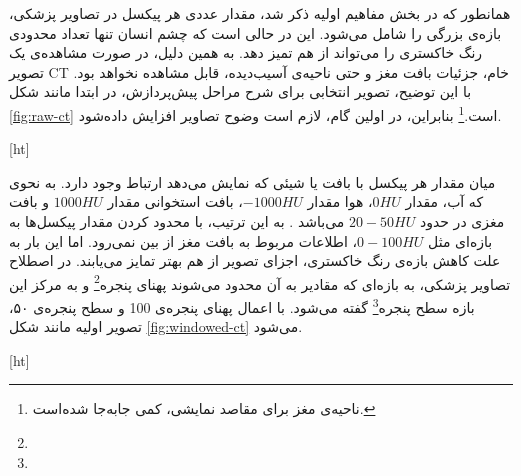 همانطور که در بخش مفاهیم اولیه ذکر شد، مقدار عددی هر پیکسل در تصاویر پزشکی، بازه‌ی بزرگی را شامل می‌شود.
این در حالی است که چشم انسان تنها تعداد محدودی رنگ خاکستری را می‌تواند از هم تمیز دهد.
به همین دلیل، در صورت مشاهده‌ی یک تصویر CT خام، جزئیات بافت مغز و حتی ناحیه‌ی آسیب‌دیده، قابل مشاهده نخواهد بود. 
با این توضیح، تصویر انتخابی برای شرح مراحل پیش‌پردازش، در ابتدا مانند 
شکل \ref{fig:raw-ct} است.\footnote{ناحیه‌ی مغز برای مقاصد نمایشی، کمی جا‌به‌جا شده‌است.}
بنابراین، در اولین گام، لازم است وضوح تصاویر افزایش داده‌شود.


[ht]

 میان مقدار هر پیکسل با بافت یا شیئی که نمایش می‌دهد ارتباط وجود دارد.
به نحوی که آب، مقدار $0 HU$، هوا مقدار $-1000 HU$، بافت استخوانی مقدار $1000 HU$ و بافت مغزی در حدود $20-50 HU$ می‌باشد \cite{kamalian2016computed}.
به این ترتیب، با محدود کردن مقدار پیکسل‌ها به بازه‌ای مثل $0-100 HU$، اطلاعات مربوط به بافت مغز از بین نمی‌رود.
اما این بار به علت کاهش بازه‌ی رنگ خاکستری، اجزای تصویر از هم بهتر تمایز می‌یابند.
در اصطلاح تصاویر پزشکی، به بازه‌ای که مقادیر به آن محدود می‌شوند 
پهنای پنجره\footnote{}
و به مرکز این بازه
 سطح پنجره\footnote{} گفته می‌شود.
با اعمال پهنای پنجره‌ی 100 و سطح پنجره‌ی ۵۰، تصویر اولیه مانند شکل 
\ref{fig:windowed-ct}
می‌شود.


[ht]


